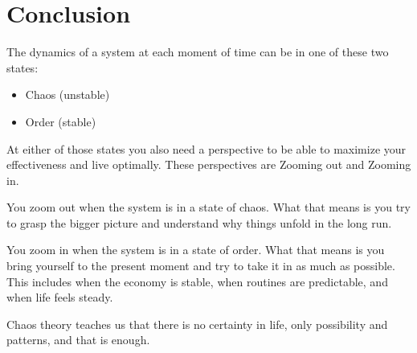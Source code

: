 \documentclass[12pt]{article}
\begin{document}
\section{Conclusion}

The dynamics of a system at each moment of time can be in one of these two states:
\begin{itemize}
    \item Chaos (unstable)
    \item Order (stable)
\end{itemize}


At either of those states you also need a perspective to be able to maximize your effectiveness and live optimally. These perspectives are Zooming out and Zooming in. 

You zoom out when the system is in a state of chaos. What that means is you try to grasp the bigger picture and understand why things unfold in the long run.

You zoom in when the system is in a state of order. What that means is you bring yourself to the present moment and try to take it in as much as possible. This includes when the economy is stable, when routines are predictable, and when life feels steady.

Chaos theory teaches us that there is no certainty in life, only possibility and patterns, and that is enough.


\nocite{*} 
 

\end{document}
